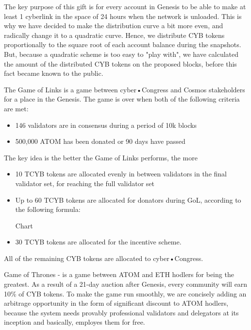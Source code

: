\documentclass[8pt,oneside]{amsart}
\begin{document}
\begin{Abstract}
The key purpose of this gift is for every account in Genesis to be able to make at least 1 cyberlink in the space of 24 hours when the network is unloaded. This is why we have decided to make the distribution curve a bit more even, and radically change it to a quadratic curve. Hence, we distribute CYB tokens proportionally to the square root of each account balance during the snapshots. But, because a quadratic scheme is too easy to "play with", we have calculated the amount of the distributed CYB tokens on the proposed blocks, before this fact became known to the public.

The Game of Links is a game between cyber•Congress and Cosmos stakeholders for a place in the Genesis. The game is over when both of the following criteria are met:
\begin{itemize}
\item 146 validators are in consensus during a period of 10k blocks
\item 500,000 ATOM has been donated or 90 days have passed
\end{itemize}

The key idea is the better the Game of Links performs, the more %

\begin{itemize}
\item 10 TCYB tokens are allocated evenly in between validators in the final validator set, for reaching the full validator set
\item Up to 60 TCYB tokens are allocated for donators during GoL, according to the following formula:

Chart

\item 30 TCYB tokens are allocated for the incentive scheme.
\end{itemize}

All of the remaining CYB tokens are allocated to cyber•Congress.

Game of Thrones - is a game between ATOM and ETH hodlers for being the greatest. As a result of a 21-day auction after Genesis, every community will earn 10\% of CYB tokens. To make the game run smoothly, we are concisely adding an arbitrage opportunity in the form of significant discount to ATOM hodlers, because the system needs provably professional validators and delegators at its inception and basically, employes them for free.


\end{Abstract}
\end{document}
